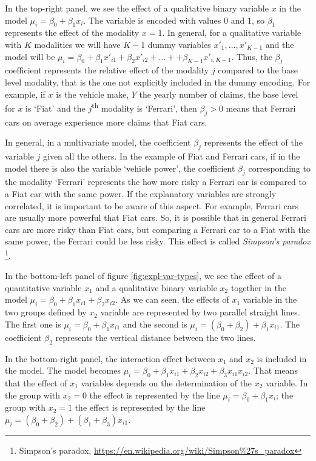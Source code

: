 \documentclass[a4paper, nobind]{templates/ociamthesis}
\theoremstyle{definition}
\theoremstyle{definition}
\theoremstyle{definition}
\theoremstyle{remark}
\begin{document}
In the top-right panel, we see the effect of a qualitative binary variable \(x\) in the model \(\mu_i = \beta_0 + \beta_1 x_i\). The variable is encoded with values \(0\) and \(1\), so \(\beta_1\) represents the effect of the modality \(x=1\). In general, for a qualitative variable with \(K\) modalities we will have \(K-1\) dummy variables \(x'_1, \dots, x'_{K-1}\) and the model will be \(\mu_i = \beta_0 + \beta_1 x'_{i1} + \beta_2 x'_{i2} + \dots + + \beta_{K-1} x'_{i, K-1}\). Thus, the \(\beta_j\) coefficient represents the relative effect of the modality \(j\) compared to the base level modality, that is the one not explicitly included in the dummy encoding. For example, if \(x\) is the vehicle make, \(Y\) the yearly number of claims, the base level for \(x\) is `Fiat' and the \(j\)\textsuperscript{th} modality is `Ferrari', then \(\beta_j>0\) means that Ferrari cars on average experience more claims that Fiat cars.

In general, in a multivariate model, the coefficient \(\beta_j\) represents the effect of the variable \(j\) given all the others. In the example of Fiat and Ferrari cars, if in the model there is also the variable `vehicle power', the coefficient \(\beta_j\) corresponding to the modality `Ferrari' represents the how more risky a Ferrari car is compared to a Fiat car with the same power. If the explanatory variables are strongly correlated, it is important to be aware of this aspect. For example, Ferrari cars are usually more powerful that Fiat cars. So, it is possible that in general Ferrari cars are more risky than Fiat cars, but comparing a Ferrari car to a Fiat with the same power, the Ferrari could be less risky. This effect is called \emph{Simpson's paradox} \footnote{Simpson's paradox, \url{https://en.wikipedia.org/wiki/Simpson\%27s_paradox}}.

In the bottom-left panel of figure \ref{fig:expl-var-types}, we see the effect of a quantitative variable \(x_1\) and a qualitative binary variable \(x_2\) together in the model \(\mu_i = \beta_0 + \beta_1 x_{i1} + \beta_2 x_{i2}\). As we can seen, the effects of \(x_1\) variable in the two groups defined by \(x_2\) variable are represented by two parallel straight lines. The first one is \(\mu_i = \beta_0 + \beta_1 x_{i1}\) and the second is \(\mu_i = \left(\beta_0 + \beta_2\right) + \beta_1 x_{i1}\). The coefficient \(\beta_2\) represents the vertical distance between the two lines.

In the bottom-right panel, the interaction effect between \(x_1\) and \(x_2\) is included in the model. The model becomes \(\mu_i = \beta_0 + \beta_1 x_{i1} + \beta_2 x_{i2} + \beta_3 x_{i1} x_{i2}\). That means that the effect of \(x_1\) variables depends on the determination of the \(x_2\) variable. In the group with \(x_2=0\) the effect is represented by the line \(\mu_i = \beta_0 + \beta_1 x_i\); the group with \(x_2=1\) the effect is represented by the line \(\mu_i = \left(\beta_0 + \beta_2\right) + \left(\beta_1 + \beta_3\right) x_{i1}\).
\end{document}
